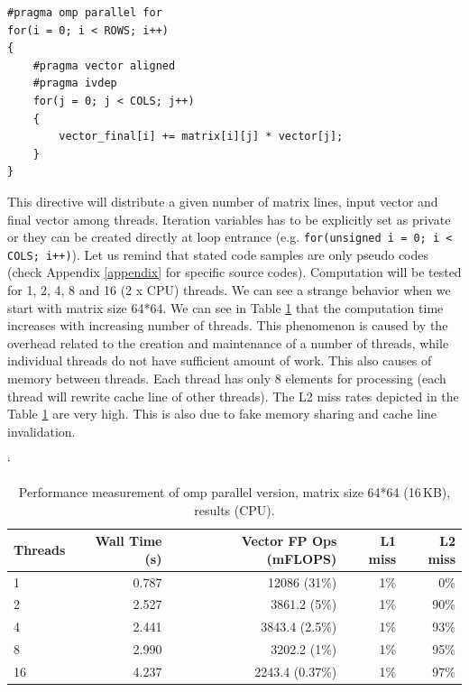 \bigskip
\begin{lstlisting}[caption={Matrix vector multiplication pseudo code, PARALLEL directive.}, captionpos=b, label=code_matvec_ivdep_aligned_parallel]
#pragma omp parallel for
for(i = 0; i < ROWS; i++)
{
    #pragma vector aligned
    #pragma ivdep
    for(j = 0; j < COLS; j++)
    {    
        vector_final[i] += matrix[i][j] * vector[j];
    }
}
\end{lstlisting}
\bigskip

This directive will distribute a given number of matrix lines, input vector and final vector among threads. Iteration variables has to be explicitly set as private or they can be created directly at loop entrance (e.g. \texttt{for(unsigned i = 0; i < COLS; i++)}). Let us remind that stated code samples are only pseudo codes (check Appendix \ref{appendix} for specific source codes). Computation will be tested for 1, 2, 4, 8 and 16 (2 x CPU) threads. We can see a strange behavior when we start with matrix size 64*64. We can see in Table \ref{tab:table_matvec_parallel_64} that the computation time increases with increasing number of threads. This phenomenon is caused by the overhead related to the creation and maintenance of a  number of threads, while individual threads do not have sufficient amount of work. This also causes  of memory between threads. Each thread has only 8 elements for processing (each thread will rewrite cache line of other threads). The L2 miss rates depicted in the Table \ref{tab:table_matvec_parallel_64} are very high. This is also due to fake memory sharing and cache line invalidation.

\begin{table}[ht]
\catcode`
\begin{center}
\begin{tabular}{| l | r | r | r | r |} \hline
\textbf{Threads} & \textbf{Wall Time (s)} & \textbf{Vector FP Ops (mFLOPS)} & L1 miss & L2 miss\\ \hline
1 & 0.787 & 12086 (31\%) & 1\% & 0\%\\ \hline
2 & 2.527 & 3861.2 (5\%) & 1\% & 90\%\\ \hline
4 & 2.441 & 3843.4 (2.5\%) & 1\% & 93\%\\ \hline
8 & 2.990 & 3202.2 (1\%) & 1\% & 95\%\\ \hline
16 & 4.237 & 2243.4 (0.37\%) & 1\% & 97\%\\ \hline
\end{tabular}
\caption{Performance measurement of omp parallel version, matrix size 64*64 (16\,KB),  results (CPU).}
\label{tab:table_matvec_parallel_64}
\end{center}
\end{table}

